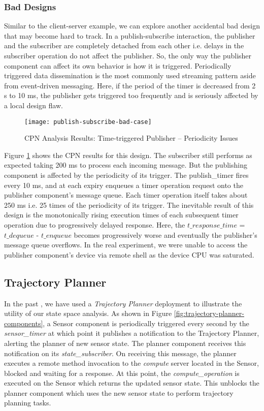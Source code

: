 \subsubsection{Bad Designs}

Similar to the client-server example, we can explore another accidental bad design that may become hard to track. In a publish-subscribe interaction, the publisher and the subscriber are completely detached from each other i.e. delays in the subscriber operation do not affect the publisher. So, the only way the publisher component can affect its own behavior is how it is triggered. Periodically triggered data dissemination is the most commonly used streaming pattern aside from event-driven messaging. Here, if the period of the timer is decreased from 2 s to 10 ms, the publisher gets triggered too frequently and is seriously affected by a local design flaw.  

\begin{figure}[h]
	\centering
	\texttt{[image: publish-subscribe-bad-case]}
	\caption{CPN Analysis Results: Time-triggered Publisher -- Periodicity Issues}
	\label{fig:publish-subscribe-bad-case}
\end{figure}
\FloatBarrier

Figure \ref{fig:publish-subscribe-bad-case} shows the CPN results for this design. The subscriber still performs as expected taking 200 ms to process each incoming message. But the publishing component is affected by the periodicity of its trigger. The publish\_timer fires every 10 ms, and at each expiry enqueues a timer operation request onto the publisher component's message queue. Each timer operation itself takes about 250 ms i.e. 25 times of the periodicity of its trigger. The inevitable result of this design is the monotonically rising execution times of each subsequent timer operation due to progressively delayed response. Here, the $t\_response\_time$ = $t\_dequeue$ - $t\_enqueue$ becomes progressively worse and eventually the publisher's message queue overflows. In the real experiment, we were unable to access the publisher component's device via remote shell as the device CPU was saturated. 

\subsection{Trajectory Planner}

In the past \cite{kumar2014colored}, we have used a \emph{Trajectory Planner} deployment to illustrate the utility of our state space analysis. As shown in Figure \ref{fig:trajectory-planner-components}, a Sensor component is periodically triggered every second by the \emph{sensor\_timer} at which point it publishes a notification to the Trajectory Planner, alerting the planner of new sensor state. The planner component receives this notification on its \emph{state\_subscriber}. On receiving this message, the planner executes a remote method invocation to the \emph{compute} server located in the Sensor, blocked and waiting for a response. At this point, the \emph{compute\_operation} is executed on the Sensor which returns the updated sensor state. This unblocks the planner component which uses the new sensor state to perform trajectory planning tasks. 

